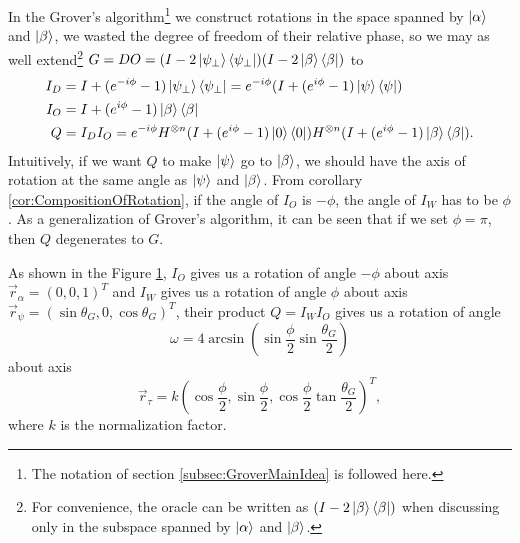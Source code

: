 \documentclass[a4paper,10pt]{book}
\numberwithin{equation}{section}
\begin{document}
In the Grover's algorithm\footnote{The notation of section \ref{subsec:GroverMainIdea} is followed here.} we construct rotations in the space spanned by $\ket{\alpha}$ and $\ket{\beta}$, we wasted the degree of freedom of their relative phase, so we may as well extend\footnote{For convenience, the oracle can be written as $(I-2\ket{\beta}\bra{\beta})$ when discussing only in the subspace spanned by $\ket{\alpha}$ and $\ket{\beta}$.} $G=DO=(I-2\ket{\psi_{\perp}}\bra{\psi_{\perp}})(I-2\ket{\beta}\bra{\beta})$ to
\begin{equation}
    \begin{split}
        I_{D} & = I+(e^{-i\phi}-1)\ket{\psi_{\perp}}\bra{\psi_{\perp}} = e^{-i\phi}(I+(e^{i\phi}-1)\ket{\psi}\bra{\psi})                   \\
        I_{O} & = I+(e^{i\phi}-1)\ket{\beta}\bra{\beta}                                                                                    \\
        Q     & = I_{D}I_{O} = e^{-i\phi}H^{\otimes n}(I+(e^{i\phi}-1)\ket{0}\bra{0})H^{\otimes n}(I+(e^{i\phi}-1)\ket{\beta}\bra{\beta}).
    \end{split}
\end{equation}
Intuitively, if we want $Q$ to make $\ket{\psi}$ go to $\ket{\beta}$, we should have the axis of rotation at the same angle as $\ket{\psi}$ and $\ket{\beta}$. From corollary \ref{cor:CompositionOfRotation}, if the angle of $I_{O}$ is $-\phi$, the angle of $I_{W}$ has to be $\phi$. As a generalization of Grover's algorithm, it can be seen that if we set $\phi=\pi$, then $Q$ degenerates to $G$.
\begin{figure}[h]
    \centering
    \resizebox{0.45\textwidth}{!}{}
    \caption{}
    \label{fig:long}
\end{figure}

As shown in the Figure \ref{fig:long}, $I_{O}$ gives us a rotation of angle $-\phi$ about axis $\vec{r}_{\alpha}=(0,0,1)^{T}$ and $I_{W}$ gives us a rotation of angle $\phi$ about axis $\vec{r}_{\psi}=(\sin\theta_{G},0,\cos\theta_{G})^{T}$, their product $Q=I_{W}I_{O}$ gives us a rotation of angle
\begin{equation}
    \omega=4\arcsin(\sin\frac{\phi}{2}\sin\frac{\theta_{G}}{2})
\end{equation}
about axis
\begin{equation}
    \vec{r}_{\tau}= k(\cos\frac{\phi}{2},\sin\frac{\phi}{2},\cos\frac{\phi}{2}\tan\frac{\theta_{G}}{2})^{T},
\end{equation}
where $k$ is the normalization factor.
\end{document}
